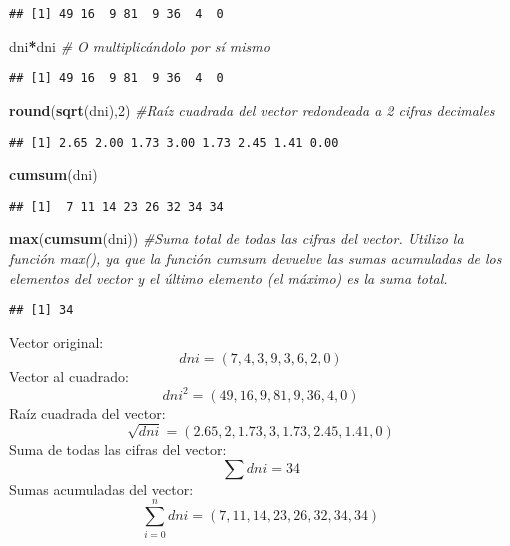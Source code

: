 \documentclass[]{article}
\newenvironment{Shaded}{\begin{snugshade}}{\end{snugshade}}
\newcommand{\KeywordTok}[1]{\textcolor[rgb]{0.13,0.29,0.53}{\textbf{#1}}}
\newcommand{\DecValTok}[1]{\textcolor[rgb]{0.00,0.00,0.81}{#1}}
\newcommand{\CommentTok}[1]{\textcolor[rgb]{0.56,0.35,0.01}{\textit{#1}}}
\newcommand{\OperatorTok}[1]{\textcolor[rgb]{0.81,0.36,0.00}{\textbf{#1}}}
\newcommand{\NormalTok}[1]{#1}
\begin{document}
\begin{verbatim}
## [1] 49 16  9 81  9 36  4  0
\end{verbatim}

\begin{Shaded}
\begin{Highlighting}[]
\NormalTok{dni}\OperatorTok{*}\NormalTok{dni }\CommentTok{# O multiplicándolo por sí mismo}
\end{Highlighting}
\end{Shaded}

\begin{verbatim}
## [1] 49 16  9 81  9 36  4  0
\end{verbatim}

\begin{Shaded}
\begin{Highlighting}[]
\KeywordTok{round}\NormalTok{(}\KeywordTok{sqrt}\NormalTok{(dni),}\DecValTok{2}\NormalTok{) }\CommentTok{#Raíz cuadrada del vector redondeada a 2 cifras decimales}
\end{Highlighting}
\end{Shaded}

\begin{verbatim}
## [1] 2.65 2.00 1.73 3.00 1.73 2.45 1.41 0.00
\end{verbatim}

\begin{Shaded}
\begin{Highlighting}[]
\KeywordTok{cumsum}\NormalTok{(dni)}
\end{Highlighting}
\end{Shaded}

\begin{verbatim}
## [1]  7 11 14 23 26 32 34 34
\end{verbatim}

\begin{Shaded}
\begin{Highlighting}[]
\KeywordTok{max}\NormalTok{(}\KeywordTok{cumsum}\NormalTok{(dni)) }\CommentTok{#Suma total de todas las cifras del vector. Utilizo la función max(), ya que la función cumsum devuelve las sumas acumuladas de los elementos del vector y el último elemento (el máximo) es la suma total. }
\end{Highlighting}
\end{Shaded}

\begin{verbatim}
## [1] 34
\end{verbatim}

Vector original: \[dni = \left(7,4,3,9,3,6,2,0 \right)\] Vector al
cuadrado: \[dni^{2}=\left(49,16,9,81,9,36,4,0 \right)\] Raíz cuadrada
del vector:
\[\sqrt{dni}=\left(2.65, 2, 1.73, 3, 1.73, 2.45, 1.41, 0 \right)\] Suma
de todas las cifras del vector: \[\sum{dni}=34\] Sumas acumuladas del
vector: \[\sum_{i=0}^{n}dni = \left(7,11,14,23,26,32,34,34 \right)\]
\end{document}
